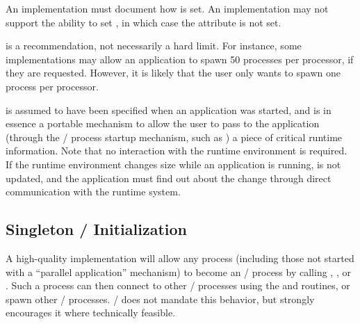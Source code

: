An implementation must document how 
is set. An implementation may not support
the ability to set , in which
case the attribute  is not
set.

 is a recommendation, not
necessarily a hard limit.  For instance, some implementations may
allow an application to spawn 50 processes per processor, if they are
requested.  However, it is likely that the user only wants to spawn
one process per processor.

 is assumed to have been
specified when an application was started, and is in essence a
portable mechanism to allow the user to pass to the application
(through the \MPI/ process startup mechanism, such as
) a piece of critical
runtime information. Note that no interaction with the runtime
environment is required.
If the runtime environment changes size while an application
is running,  is not updated, and
the application must find out about the change through direct communication
with the runtime system.



\subsection{Singleton \texorpdfstring{\MPI/}{MPI} Initialization}
\label{subsec:singleton}

A high-quality implementation will allow any
process (including those not started with a ``parallel
application'' mechanism) to become an \MPI/ process by calling
, , or .
Such a process can then
connect to other \MPI/ processes using the
 and 
routines, or spawn other \MPI/ processes.  \MPI/ does not mandate this
behavior, but strongly encourages it where technically feasible.

